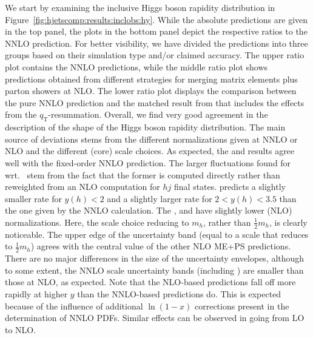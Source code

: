 We start by examining the inclusive Higgs boson rapidity distribution in
Figure~\ref{fig:hjetscomp:results:inclobs:hy}. While the absolute
predictions are given in the top panel, the plots in the bottom panel
depict the respective ratios to the NNLO prediction. For better
visibility, we have divided the predictions into three groups based on
their simulation type and/or claimed accuracy. The upper ratio plot
contains the NNLO predictions, while the middle ratio plot shows predictions obtained
from different strategies for  merging matrix elements plus parton showers
at NLO. The lower ratio plot displays the comparison between the pure
NNLO prediction and the matched result from \hjetscompResbos that includes the
effects from the $q_\text{T}$-resummation. Overall, we find very good
agreement in the description of the shape of the Higgs boson rapidity
distribution. The main source of deviations stems from the different
normalizations given at NNLO or NLO and the different (core) scale
choices. As expected, the \hjetscompSherpa \hjetscompNNLOPS and
\hjetscompPowheg \hjetscompNNLOPS results agree well with the fixed-order NNLO prediction. 
The larger fluctuations found for \hjetscompSherpa \hjetscompNNLOPS wrt.~\hjetscompPowheg \hjetscompNNLOPS
stem from the fact that the former is computed directly rather than
reweighted from an NLO computation for $hj$ final states.
\hjetscompResbos predicts a slightly smaller rate for $y(h)<2$ and a
slightly larger rate for $2<y(h)<3.5$ than the one given by the NNLO
calculation. The \hjetscompMGaMC, \hjetscompSherpa \hjetscompMEPSatNLO and \hjetscompHerwig have slightly
lower (NLO) normalizations. Here, the \hjetscompMGaMC scale choice reducing to
$m_h$, rather than $\tfrac{1}{2}m_h$, is clearly noticeable. The upper edge of
the \hjetscompMGaMC uncertainty band (equal to a scale that reduces to $\tfrac{1}{2}m_h$)
agrees with the central value of the other NLO ME+PS
predictions. There are no major differences in the size of the
uncertainty envelopes, although to some extent, the NNLO scale
uncertainty bands (including \hjetscompResbos) are smaller than those at NLO,
as expected. Note
that the NLO-based predictions fall off more rapidly at higher $y$
than the NNLO-based predictions do. This is expected because of the
influence of additional $\ln(1-x)$ corrections present in the
determination of NNLO PDFs. Similar effects can be observed in going
from LO to NLO.

